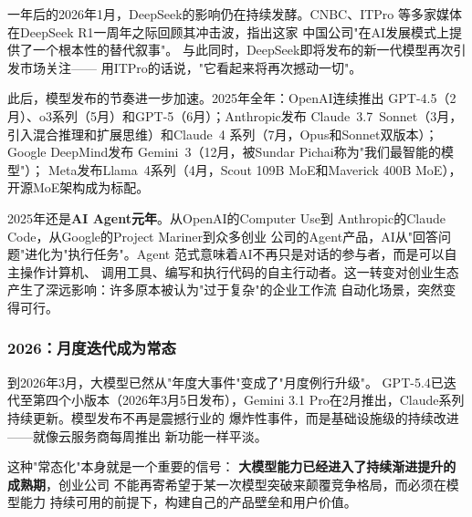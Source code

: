 一年后的2026年1月，DeepSeek的影响仍在持续发酵。CNBC、ITPro
等多家媒体在DeepSeek R1一周年之际回顾其冲击波，指出这家
中国公司"在AI发展模式上提供了一个根本性的替代叙事"。
与此同时，DeepSeek即将发布的新一代模型再次引发市场关注——
用ITPro的话说，"它看起来将再次撼动一切"。

此后，模型发布的节奏进一步加速。2025年全年：OpenAI连续推出
GPT-4.5（2月）、o3系列（5月）和GPT-5（6月）；Anthropic发布
Claude~3.7~Sonnet（3月，引入混合推理和扩展思维）和Claude~4
系列（7月，Opus和Sonnet双版本）；Google DeepMind发布
Gemini~3（12月，被Sundar Pichai称为"我们最智能的模型"）；
Meta发布Llama~4系列（4月，Scout 109B MoE和Maverick 400B MoE），
开源MoE架构成为标配。

2025年还是\textbf{AI Agent元年}。从OpenAI的Computer Use到
Anthropic的Claude Code，从Google的Project Mariner到众多创业
公司的Agent产品，AI从"回答问题"进化为"执行任务"。Agent
范式意味着AI不再只是对话的参与者，而是可以自主操作计算机、
调用工具、编写和执行代码的自主行动者。这一转变对创业生态
产生了深远影响：许多原本被认为"过于复杂"的企业工作流
自动化场景，突然变得可行。

\subsubsection{2026：月度迭代成为常态}
到2026年3月，大模型已然从"年度大事件"变成了"月度例行升级"。
GPT-5.4已迭代至第四个小版本（2026年3月5日发布），Gemini 3.1
Pro在2月推出，Claude系列持续更新。模型发布不再是震撼行业的
爆炸性事件，而是基础设施级的持续改进——就像云服务商每周推出
新功能一样平淡。

这种"常态化"本身就是一个重要的信号：
\textbf{大模型能力已经进入了持续渐进提升的成熟期}，创业公司
不能再寄希望于某一次模型突破来颠覆竞争格局，而必须在模型能力
持续可用的前提下，构建自己的产品壁垒和用户价值。

